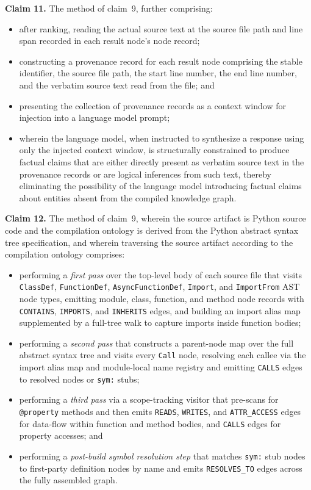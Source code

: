 \documentclass[12pt]{article}
\begin{document}
\bigskip
\noindent\textbf{Claim 11.}\quad
The method of claim~9, further comprising:
\begin{itemize}[leftmargin=2.5em]
  \item after ranking, reading the actual source text at the source file path and
    line span recorded in each result node's node record;
  \item constructing a provenance record for each result node comprising the
    stable identifier, the source file path, the start line number, the end line
    number, and the verbatim source text read from the file; and
  \item presenting the collection of provenance records as a context window for
    injection into a language model prompt;
  \item wherein the language model, when instructed to synthesize a response using
    only the injected context window, is structurally constrained to produce
    factual claims that are either directly present as verbatim source text in
    the provenance records or are logical inferences from such text, thereby
    eliminating the possibility of the language model introducing factual claims
    about entities absent from the compiled knowledge graph.
\end{itemize}

\bigskip
\noindent\textbf{Claim 12.}\quad
The method of claim~9, wherein the source artifact is Python source code and the
compilation ontology is derived from the Python abstract syntax tree
specification, and wherein traversing the source artifact according to the
compilation ontology comprises:
\begin{itemize}[leftmargin=2.5em]
  \item performing a \emph{first pass} over the top-level body of each source
    file that visits \texttt{ClassDef}, \texttt{FunctionDef},
    \texttt{AsyncFunctionDef}, \texttt{Import}, and \texttt{ImportFrom} AST
    node types, emitting module, class, function, and method node records with
    \texttt{CONTAINS}, \texttt{IMPORTS}, and \texttt{INHERITS} edges, and
    building an import alias map supplemented by a full-tree walk to capture
    imports inside function bodies;
  \item performing a \emph{second pass} that constructs a parent-node map over
    the full abstract syntax tree and visits every \texttt{Call} node, resolving
    each callee via the import alias map and module-local name registry and
    emitting \texttt{CALLS} edges to resolved nodes or \texttt{sym:} stubs;
  \item performing a \emph{third pass} via a scope-tracking visitor that
    pre-scans for \texttt{@property} methods and then emits \texttt{READS},
    \texttt{WRITES}, and \texttt{ATTR\_ACCESS} edges for data-flow within
    function and method bodies, and \texttt{CALLS} edges for property accesses;
    and
  \item performing a \emph{post-build symbol resolution step} that matches
    \texttt{sym:} stub nodes to first-party definition nodes by name and emits
    \texttt{RESOLVES\_TO} edges across the fully assembled graph.
\end{itemize}
\end{document}
